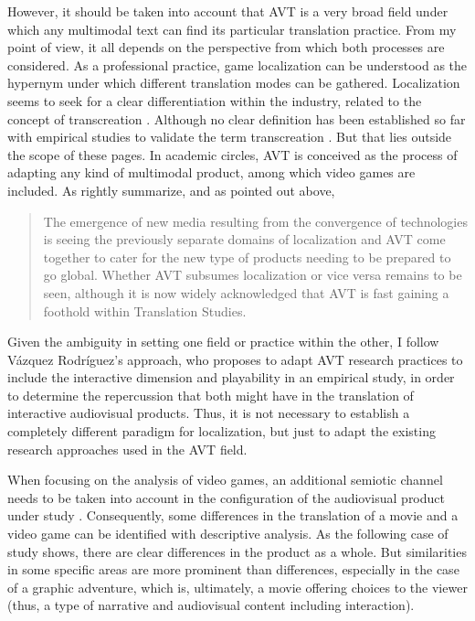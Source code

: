 \documentclass[output=paper]{langsci/langscibook}
\begin{document}
However, it should be taken into account that AVT is a very broad field under which any multimodal text can find its particular translation practice. From my point of view, it all depends on the perspective from which both processes are considered. As a professional practice, game localization can be understood as the hypernym under which different translation modes can be gathered. Localization seems to seek for a clear differentiation within the industry, related to the concept of transcreation \parencite{ohaman13}. Although no clear definition has been established so far with empirical studies to validate the term transcreation \parencite{bernal15}. But that lies outside the scope of these pages. In academic circles, AVT is conceived as the process of adapting any kind of multimodal product, among which video games are included. As \textcite{ohaman13} rightly summarize, and as pointed out above, \blockcquote[106]{ohaman13}{The emergence of new media resulting from the convergence of technologies is seeing the previously separate domains of localization and AVT come together to cater for the new type of products needing to be prepared to go global. Whether AVT subsumes localization or vice versa remains to be seen, although it is now widely acknowledged that AVT is fast gaining a foothold within Translation Studies.}

Given the ambiguity in setting one field or practice within the other, I follow Vázquez Rodríguez’s \parencite*{vazquez18} approach, who proposes to adapt AVT research practices to include the interactive dimension and playability in an empirical study, in order to determine the repercussion that both might have in the translation of interactive audiovisual products. Thus, it is not necessary to establish a completely different paradigm for localization, but just to adapt the existing research approaches used in the AVT field.

When focusing on the analysis of video games, an additional semiotic channel needs to be taken into account in the configuration of the audiovisual product under study \parencite{mejias17}. Consequently, some differences in the translation of a movie and a video game can be identified with descriptive analysis. As the following case of study shows, there are clear differences in the product as a whole. But similarities in some specific areas are more prominent than differences, especially in the case of a graphic adventure, which is, ultimately, a movie offering choices to the viewer (thus, a type of narrative and audiovisual content including interaction).
\end{document}
